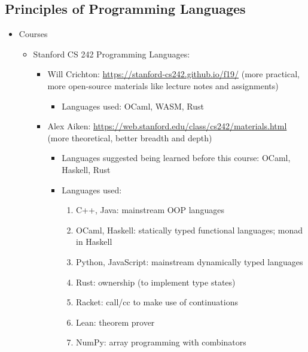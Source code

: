 \documentclass{article}
\begin{document}
\subsection{Principles of Programming Languages}
\begin{itemize}
    \item Courses
        \begin{itemize}
            \item Stanford CS 242 Programming Languages:
            \begin{itemize}
                \item Will Crichton:
                \href{https://stanford-cs242.github.io/f19/}{https://stanford-cs242.github.io/f19/} (more practical, more open-source materials like lecture notes and assignments)
                    \begin{itemize}
                        \item Languages used:
                        OCaml, WASM, Rust
                    \end{itemize}
                \item Alex Aiken:
                \href{https://web.stanford.edu/class/cs242/materials.html}{https://web.stanford.edu/class/cs242/materials.html} (more theoretical, better breadth and depth)
                    \begin{itemize}
                        \item Languages suggested being learned before this course:
                        OCaml, Haskell, Rust
                        \item Languages used:
                        \begin{enumerate}
                            \item C++, Java: mainstream OOP languages
                            \item OCaml, Haskell: statically typed functional languages; monad in Haskell
                            \item Python, JavaScript: mainstream dynamically typed languages
                            \item Rust: ownership (to implement type states)
                            \item Racket: call/cc to make use of continuations
                            \item Lean: theorem prover
                            \item NumPy: array programming with combinators
                        \end{enumerate}

\end{itemize}
\end{itemize}
\end{itemize}
\end{itemize}
\end{document}
